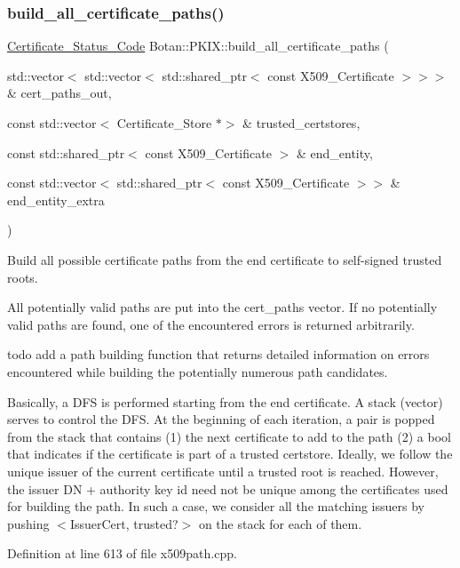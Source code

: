 \subsubsection{\texorpdfstring{build\+\_\+all\+\_\+certificate\+\_\+paths()}{build\_all\_certificate\_paths()}}
{\footnotesize\ttfamily \mbox{\hyperlink{namespace_botan_ae1e907dc90937bdda30f65216e68ff2b}{Certificate\+\_\+\+Status\+\_\+\+Code}} Botan\+::\+P\+K\+I\+X\+::build\+\_\+all\+\_\+certificate\+\_\+paths (\begin{DoxyParamCaption}\item[{std\+::vector$<$ std\+::vector$<$ std\+::shared\+\_\+ptr$<$ const X509\+\_\+\+Certificate $>$$>$$>$ \&}]{cert\+\_\+paths\+\_\+out,  }\item[{const std\+::vector$<$ Certificate\+\_\+\+Store $\ast$$>$ \&}]{trusted\+\_\+certstores,  }\item[{const std\+::shared\+\_\+ptr$<$ const X509\+\_\+\+Certificate $>$ \&}]{end\+\_\+entity,  }\item[{const std\+::vector$<$ std\+::shared\+\_\+ptr$<$ const X509\+\_\+\+Certificate $>$$>$ \&}]{end\+\_\+entity\+\_\+extra }\end{DoxyParamCaption})}

Build all possible certificate paths from the end certificate to self-\/signed trusted roots.

All potentially valid paths are put into the cert\+\_\+paths vector. If no potentially valid paths are found, one of the encountered errors is returned arbitrarily.

todo add a path building function that returns detailed information on errors encountered while building the potentially numerous path candidates.

Basically, a D\+FS is performed starting from the end certificate. A stack (vector) serves to control the D\+FS. At the beginning of each iteration, a pair is popped from the stack that contains (1) the next certificate to add to the path (2) a bool that indicates if the certificate is part of a trusted certstore. Ideally, we follow the unique issuer of the current certificate until a trusted root is reached. However, the issuer DN + authority key id need not be unique among the certificates used for building the path. In such a case, we consider all the matching issuers by pushing $<$Issuer\+Cert, trusted?$>$ on the stack for each of them. 

Definition at line 613 of file x509path.\+cpp.

